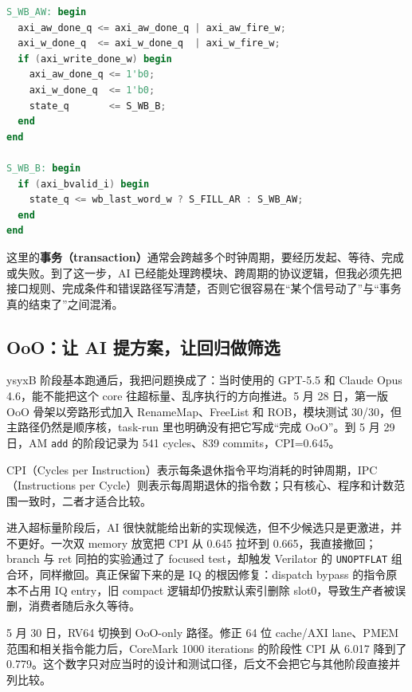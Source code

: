 \documentclass[UTF8,a4paper,zihao=-4,oneside]{ctexart}
\begin{document}
\noindent\begin{minipage}{\linewidth}
\begin{lstlisting}[language=Verilog,firstnumber=428,
  caption={5 月产物：DCache 脏行写回的 AW/W/B 状态拆分（快照 2e7561c70）},
  label={code:past-may}]
S_WB_AW: begin
  axi_aw_done_q <= axi_aw_done_q | axi_aw_fire_w;
  axi_w_done_q  <= axi_w_done_q  | axi_w_fire_w;
  if (axi_write_done_w) begin
    axi_aw_done_q <= 1'b0;
    axi_w_done_q  <= 1'b0;
    state_q       <= S_WB_B;
  end
end

S_WB_B: begin
  if (axi_bvalid_i) begin
    state_q <= wb_last_word_w ? S_FILL_AR : S_WB_AW;
  end
end
\end{lstlisting}
\end{minipage}

这里的\textbf{事务（transaction）}通常会跨越多个时钟周期，要经历发起、等待、完成或失败。到了这一步，AI 已经能处理跨模块、跨周期的协议逻辑，但我必须先把接口规则、完成条件和错误路径写清楚，否则它很容易在“某个信号动了”与“事务真的结束了”之间混淆。

\subsection{OoO：让 AI 提方案，让回归做筛选}

ysyxB 阶段基本跑通后，我把问题换成了：当时使用的 GPT-5.5 和 Claude Opus 4.6，能不能把这个 core 往超标量、乱序执行的方向推进。5 月 28 日，第一版 OoO 骨架以旁路形式加入 RenameMap、FreeList 和 ROB，模块测试 30/30，但主路径仍然是顺序核，task-run 里也明确没有把它写成“完成 OoO”。到 5 月 29 日，AM \texttt{add} 的阶段记录为 541 cycles、839 commits，CPI=0.645。

CPI（Cycles per Instruction）表示每条退休指令平均消耗的时钟周期，IPC（Instructions per Cycle）则表示每周期退休的指令数；只有核心、程序和计数范围一致时，二者才适合比较。

进入超标量阶段后，AI 很快就能给出新的实现候选，但不少候选只是更激进，并不更好。一次双 memory 放宽把 CPI 从 0.645 拉坏到 0.665，我直接撤回；branch 与 ret 同拍的实验通过了 focused test，却触发 Verilator 的 \texttt{UNOPTFLAT} 组合环，同样撤回。真正保留下来的是 IQ 的根因修复：dispatch bypass 的指令原本不占用 IQ entry，旧 compact 逻辑却仍按默认索引删除 slot0，导致生产者被误删，消费者随后永久等待。

5 月 30 日，RV64 切换到 OoO-only 路径。修正 64 位 cache/AXI lane、PMEM 范围和相关指令能力后，CoreMark 1000 iterations 的阶段性 CPI 从 6.017 降到了 0.779。这个数字只对应当时的设计和测试口径，后文不会把它与其他阶段直接并列比较。
\end{document}
